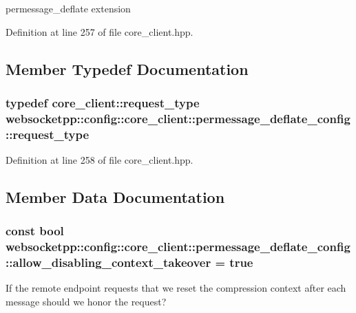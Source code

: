 permessage\+\_\+deflate extension 

Definition at line 257 of file core\+\_\+client.\+hpp.



\subsection{Member Typedef Documentation}
\hypertarget{structwebsocketpp_1_1config_1_1core__client_1_1permessage__deflate__config_ad232507a23e7a2c6c70ae631dc87b80d}{}
\subsubsection[{request\+\_\+type}]{\setlength{\rightskip}{0pt plus 5cm}typedef {\bf core\+\_\+client\+::request\+\_\+type} {\bf websocketpp\+::config\+::core\+\_\+client\+::permessage\+\_\+deflate\+\_\+config\+::request\+\_\+type}}\label{structwebsocketpp_1_1config_1_1core__client_1_1permessage__deflate__config_ad232507a23e7a2c6c70ae631dc87b80d}


Definition at line 258 of file core\+\_\+client.\+hpp.



\subsection{Member Data Documentation}
\hypertarget{structwebsocketpp_1_1config_1_1core__client_1_1permessage__deflate__config_ab7cbd54d076521a3edf75bb44144d676}{}
\subsubsection[{allow\+\_\+disabling\+\_\+context\+\_\+takeover}]{\setlength{\rightskip}{0pt plus 5cm}const bool websocketpp\+::config\+::core\+\_\+client\+::permessage\+\_\+deflate\+\_\+config\+::allow\+\_\+disabling\+\_\+context\+\_\+takeover = true\hspace{0.3cm}{\ttfamily [static]}}\label{structwebsocketpp_1_1config_1_1core__client_1_1permessage__deflate__config_ab7cbd54d076521a3edf75bb44144d676}
If the remote endpoint requests that we reset the compression context after each message should we honor the request? 

